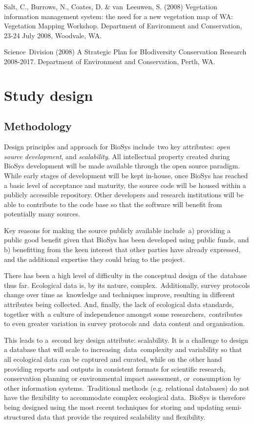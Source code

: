 \documentclass[version=last,
    paper=a4,                               %
    10pt,                                   %
    dvipsnames,
    oneside,                              %
    headings=openany,                       %
    open=any,
    BCOR=7mm,                               %
    DIV=15,     %
]{scrbook}
\begin{document}
Salt, C., Burrows, N., Coates, D. \& van~Leeuwen, S. (2008) Vegetation
information management system: the need for a new vegetation map of WA:
Vegetation Mapping Workshop. Department of Environment and Conservation,
23-24 July 2008, Woodvale, WA.

Science~Division (2008) A Strategic Plan for BIodiversity Conservation
Research 2008-2017. Department of Environment and Conservation, Perth,
WA.



\section*{Study design}


\subsection*{Methodology}

Design principles and approach for BioSys include~two key attributes:
\emph{open source development}, and \emph{scalability}. All intellectual
property created during BioSys development will be made available
through the open source paradigm. While early stages of development will
be kept in-house, once BioSys has reached a basic level of acceptance
and maturity, the source code will be housed within a publicly
accessible repository. Other developers and research institutions will
be able to contribute to the code base so that the software will benefit
from potentially many sources.

Key reasons for making the source publicly available include~a)
providing a public good benefit given that BioSys has been developed
using public funds, and b) benefitting from the keen interest that other
parties have already expressed, and the additional expertise they could
bring to the project.

There has been a high level of difficulty in the conceptual design of
the~database thus far. Ecological data is, by its nature,
complex.~Additionally, survey protocols change over time as~knowledge
and techniques improve, resulting in different attributes being
collected. And, finally, the lack of ecological data standards, together
with~a culture of independence amongst some researchers,~contributes to
even greater variation in survey protocols and~data content and
organisation.

This leads to a~second key design attribute: scalability. It is a
challenge to design a database that will scale to
increasing~data~complexity and variability so that all ecological data
can be captured and curated, while on the other hand providing reports
and outputs in consistent formats for scientific research, conservation
planning or environmental impact assessment, or~consumption by other
information systems.~Traditional methods (e.g. relational databases) do
not have the flexibility to accommodate complex ecological data.~BioSys
is therefore being designed using the most recent techniques for storing
and updating semi-structured data that provide the required scalability
and flexibility.
\end{document}
